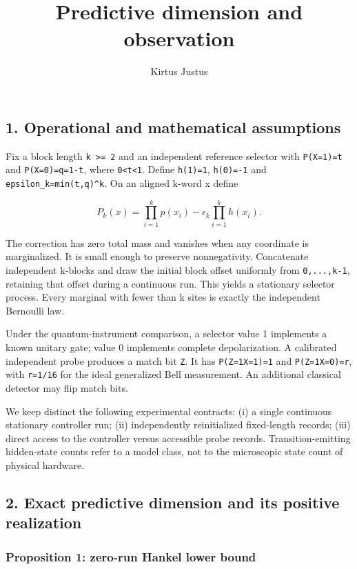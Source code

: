 \documentclass[
  10pt,
  a4paper,
]{article}
\title{Predictive dimension and observation}
\author{Kirtus Justus}
\date{}
\begin{document}
\maketitle

\subsection{1. Operational and mathematical assumptions}\label{operational-and-mathematical-assumptions}

Fix a block length \texttt{k\ \textgreater{}=\ 2} and an independent reference selector with \texttt{P(X=1)=t} and \texttt{P(X=0)=q=1-t}, where \texttt{0\textless{}t\textless{}1}. Define \texttt{h(1)=1}, \texttt{h(0)=-1} and \texttt{epsilon\_k=min(t,q)\^{}k}. On an aligned k-word x define

\[
P_k(x)=\prod_{i=1}^k p(x_i)-\epsilon_k\prod_{i=1}^k h(x_i).
\]

The correction has zero total mass and vanishes when any coordinate is marginalized. It is small enough to preserve nonnegativity. Concatenate independent k-blocks and draw the initial block offset uniformly from \texttt{0,...,k-1}, retaining that offset during a continuous run. This yields a stationary selector process. Every marginal with fewer than k sites is exactly the independent Bernoulli law.

Under the quantum-instrument comparison, a selector value 1 implements a known unitary gate; value 0 implements complete depolarization. A calibrated independent probe produces a match bit \texttt{Z}. It has \texttt{P(Z=1\textbar{}X=1)=1} and \texttt{P(Z=1\textbar{}X=0)=r}, with \texttt{r=1/16} for the ideal generalized Bell measurement. An additional classical detector may flip match bits.

We keep distinct the following experimental contracts: (i) a single continuous stationary controller run; (ii) independently reinitialized fixed-length records; (iii) direct access to the controller versus accessible probe records. Transition-emitting hidden-state counts refer to a model class, not to the microscopic state count of physical hardware.

\subsection{2. Exact predictive dimension and its positive realization}\label{exact-predictive-dimension-and-its-positive-realization}

\subsubsection{Proposition 1: zero-run Hankel lower bound}\label{proposition-1-zero-run-hankel-lower-bound}
\end{document}
